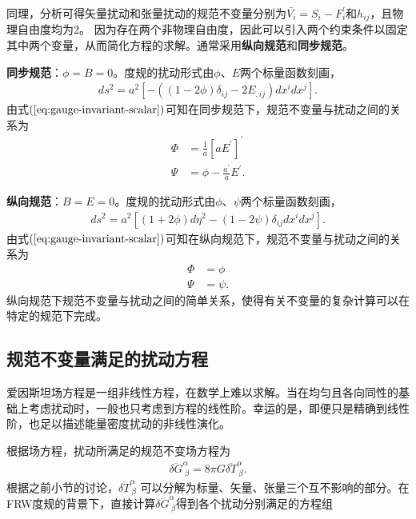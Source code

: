 同理，分析可得矢量扰动和张量扰动的规范不变量分别为$\bar{V_{i}}=S_{i}-F^\prime_{i}$和$h_{ij}$，且物理自由度均为$2$。
因为存在两个非物理自由度，因此可以引入两个约束条件以固定其中两个变量，从而简化方程的求解。通常采用\textbf{纵向规范}和\textbf{同步规范}。

\textbf{同步规范}：$\phi=B=0$。度规的扰动形式由$\phi$、$E$两个标量函数刻画，
\begin{align}
	\label{eq:synchronous-gauge-metric}
	ds^2=a^2{\left[-((1-2\phi)\delta_{ij}-2E_{,ij})dx^{i}dx^{j}\right]}.
\end{align}
由式$(\ref{eq:gauge-invariant-scalar})$可知在同步规范下，规范不变量与扰动之间的关系为
\begin{align}
	\Phi & =\frac{1}{a}{\left[aE^\prime\right]}^{\prime} \\
	\Psi & =\phi-\frac{a^\prime}{a}E^\prime.
\end{align}

\textbf{纵向规范}：$B=E=0$。度规的扰动形式由$\phi$、$\psi$两个标量函数刻画，
\begin{align}
	ds^2=a^2{\left[(1+2\phi)d\eta^2-(1-2\psi)\delta_{ij}dx^{i}dx^{j}\right]}.
\end{align}
由式$(\ref{eq:gauge-invariant-scalar})$可知在纵向规范下，规范不变量与扰动之间的关系为
\begin{align}
	\Phi & = \phi  \\
	\Psi & = \psi.
\end{align}
纵向规范下规范不变量与扰动之间的简单关系，使得有关不变量的复杂计算可以在特定的规范下完成。

\subsection{规范不变量满足的扰动方程}
爱因斯坦场方程是一组非线性方程，在数学上难以求解。当在均匀且各向同性的基础上考虑扰动时，一般也只考虑到方程的线性阶。幸运的是，即便只是精确到线性阶，也足以描述能量密度扰动的非线性演化。

根据场方程，扰动所满足的规范不变场方程为
\begin{align}
	\label{eq:gauge-invariant-perturbation-equation}
	\overline{\delta G}^{\alpha}_{~\beta}=8\pi G\overline{\delta
		T}^{\alpha}_{~\beta}.
\end{align}
根据之前小节的讨论，$\overline{\delta
		T}^{\alpha}_{~\beta}$
可以分解为标量、矢量、张量三个互不影响的部分。在FRW度规的背景下，直接计算$\overline{\delta
		G}^{\alpha}_{~\beta}$得到各个扰动分别满足的方程组

